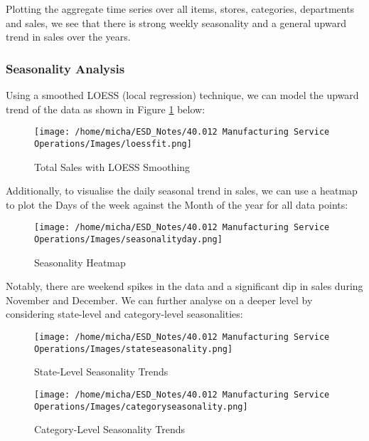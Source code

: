 \documentclass[12pt]{article}
\begin{document}
\noindent Plotting the aggregate time series over all items, stores, categories, departments and sales, we see that there is strong weekly seasonality and a general upward trend in sales over the years. 

\subsubsection*{Seasonality Analysis}

Using a smoothed LOESS (local regression) technique, we can model the upward trend of the data as shown in Figure \ref{fig:6-loessgraph} below: 

\begin{figure}[H]
    \centering
    \texttt{[image: /home/micha/ESD\_Notes/40.012 Manufacturing Service Operations/Images/loessfit.png]}
    \caption{Total Sales with LOESS Smoothing}
    \label{fig:6-loessgraph}
\end{figure} 

Additionally, to visualise the daily seasonal trend in sales, we can use a heatmap to plot the Days of the week against the Month of the year for all data points: 

\begin{figure}[H]
    \centering
    \texttt{[image: /home/micha/ESD\_Notes/40.012 Manufacturing Service Operations/Images/seasonalityday.png]}
    \caption{Seasonality Heatmap}
    \label{fig:6-seasonalityplot}
\end{figure} 

\noindent Notably, there are weekend spikes in the data and a significant dip in sales during November and December. We can further analyse on a deeper level by considering state-level and category-level seasonalities:

\begin{figure}[H]
    \centering
    \texttt{[image: /home/micha/ESD\_Notes/40.012 Manufacturing Service Operations/Images/stateseasonality.png]}
    \caption{State-Level Seasonality Trends}
    \label{fig:6-stateseasonality}
\end{figure} 

\begin{figure}[H]
    \centering
    \texttt{[image: /home/micha/ESD\_Notes/40.012 Manufacturing Service Operations/Images/categoryseasonality.png]}
    \caption{Category-Level Seasonality Trends}
    \label{fig:6-categoryseasonality}
\end{figure} 
\end{document}
